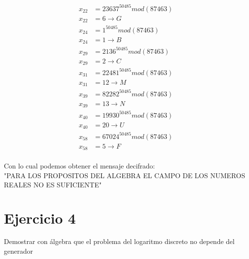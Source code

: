 \documentclass[12pt, letterpaper]{article}
\begin{document}
\begin{itemize}
\begin{equation*}
\begin{split}
x_{22}&=23637^{50485} mod (87463)\\x_{22}&=6\rightarrow G\\
x_{24}&=1^{50485} mod (87463)\\x_{24}&=1\rightarrow B\\
x_{29}&=2136^{50485} mod (87463)\\x_{29}&=2\rightarrow C\\
x_{31}&=22481^{50485} mod (87463)\\x_{31}&=12\rightarrow M\\
x_{39}&=82282^{50485} mod (87463)\\x_{39}&=13\rightarrow N\\
x_{40}&=19930^{50485} mod (87463)\\x_{40}&=20\rightarrow U\\
x_{58}&=67024^{50485} mod (87463)\\x_{58}&=5\rightarrow F\\
\end{split}
\end{equation*}

Con lo cual podemos obtener el mensaje decifrado:\\

"PARA LOS PROPOSITOS DEL ALGEBRA EL CAMPO DE LOS NUMEROS REALES NO ES SUFICIENTE"


\end{itemize}


\section*{Ejercicio 4}
Demostrar con álgebra que el problema del logaritmo discreto no depende del generador
\end{document}
